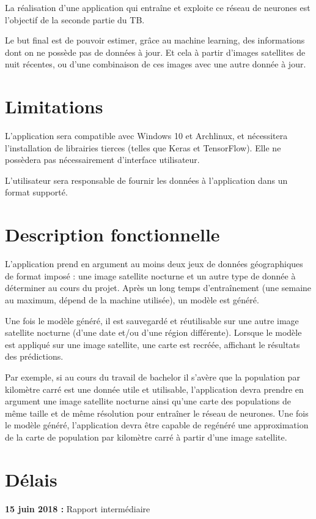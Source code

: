 \documentclass[a4paper, 11pt]{report}
\begin{document}
La réalisation d'une application qui entraîne et exploite ce réseau de neurones est l'objectif de la seconde partie du TB.

Le but final est de pouvoir estimer, grâce au machine learning, des informations dont on ne possède pas de données à jour. Et cela à partir d'images satellites de nuit récentes, ou d'une combinaison de ces images avec une autre donnée à jour.

\section{Limitations}
L'application sera compatible avec Windows 10 et Archlinux, et nécessitera l'installation de librairies tierces (telles que Keras et TensorFlow).
Elle ne possèdera pas nécessairement d'interface utilisateur.

L'utilisateur sera responsable de fournir les données à l'application dans un format supporté.

\section{Description fonctionnelle}
L'application prend en argument au moins deux jeux de données géographiques de format imposé : une image satellite nocturne et un autre type de donnée à déterminer au cours du projet. Après un long temps d'entraînement (une semaine au maximum, dépend de la machine utilisée), un modèle est généré.

Une fois le modèle généré, il est sauvegardé et réutilisable sur une autre image satellite nocturne (d'une date et/ou d'une région différente). Lorsque le modèle est appliqué sur une image satellite, une carte est recréée, affichant le résultats des prédictions.

Par exemple, si au cours du travail de bachelor il s'avère que la population par kilomètre carré est une donnée utile et utilisable, l'application devra prendre en argument une image satellite nocturne ainsi qu'une carte des populations de même taille et de même résolution pour entraîner le réseau de neurones. Une fois le modèle généré, l'application devra être capable de regénéré une approximation de la carte de population par kilomètre carré à partir d'une image satellite.

\section{Délais}
\textbf{15 juin 2018 :} Rapport intermédiaire
\end{document}
